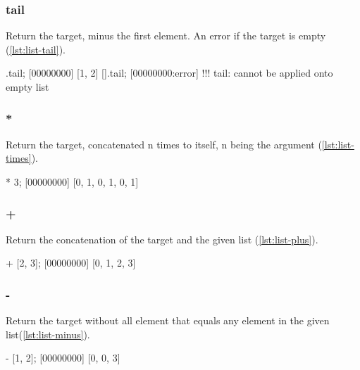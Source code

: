 \subsubsection{tail}

Return the target, minus the first element. An error if the target is
empty (\autoref{lst:list-tail}).

\begin{urbiscript}[caption=List.tail, label=lst:list-tail]
[0, 1, 2].tail;
[00000000] [1, 2]
[].tail;
[00000000:error] !!! tail: cannot be applied onto empty list
\end{urbiscript}

\subsubsection{*}

Return the target, concatenated n times to itself, n being the
argument (\autoref{lst:list-times}).

\begin{urbiscript}[caption={List.'*'}, label=lst:list-times]
[0, 1] * 3;
[00000000] [0, 1, 0, 1, 0, 1]
\end{urbiscript}

\subsubsection{+}

Return the concatenation of the target and the given list
(\autoref{lst:list-plus}).

\begin{urbiscript}[caption={List.'+'}, label=lst:list-plus,
  float=\floatpos]
[0, 1] + [2, 3];
[00000000] [0, 1, 2, 3]
\end{urbiscript}

\subsubsection{-}

Return the target without all element that equals any element in the
given list(\autoref{lst:list-minus}).

\begin{urbiscript}[caption={List.'-'}, label=lst:list-minus,
  float=\floatpos]
[0, 1, 0, 2, 3] - [1, 2];
[00000000] [0, 0, 3]
\end{urbiscript}

